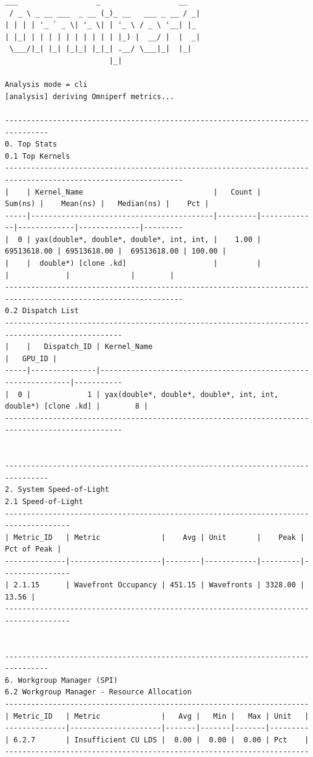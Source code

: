 \documentclass[
]{article}
\begin{document}
\begin{Verbatim}[fontsize=\footnotesize]
  ___                  _                  __
 / _ \ _ __ ___  _ __ (_)_ __   ___ _ __ / _|
| | | | '_ ` _ \| '_ \| | '_ \ / _ \ '__| |_
| |_| | | | | | | | | | | |_) |  __/ |  |  _|
 \___/|_| |_| |_|_| |_|_| .__/ \___|_|  |_|
                        |_|

Analysis mode = cli
[analysis] deriving Omniperf metrics...

--------------------------------------------------------------------------------
0. Top Stats
0.1 Top Kernels
---------------------------------------------------------------------------------------------------------------
|    | Kernel_Name                              |   Count |     Sum(ns) |    Mean(ns) |   Median(ns) |    Pct |
-----|------------------------------------------|---------|-------------|-------------|--------------|---------
|  0 | yax(double*, double*, double*, int, int, |    1.00 | 69513618.00 | 69513618.00 |  69513618.00 | 100.00 |
|    |  double*) [clone .kd]                    |         |             |             |              |        |
---------------------------------------------------------------------------------------------------------------
0.2 Dispatch List
-------------------------------------------------------------------------------------------------
|    |   Dispatch_ID | Kernel_Name                                                   |   GPU_ID |
-----|---------------|---------------------------------------------------------------|-----------
|  0 |             1 | yax(double*, double*, double*, int, int, double*) [clone .kd] |        8 |
-------------------------------------------------------------------------------------------------


--------------------------------------------------------------------------------
2. System Speed-of-Light
2.1 Speed-of-Light
-------------------------------------------------------------------------------------
| Metric_ID   | Metric              |    Avg | Unit       |    Peak |   Pct of Peak |
--------------|---------------------|--------|------------|---------|----------------
| 2.1.15      | Wavefront Occupancy | 451.15 | Wavefronts | 3328.00 |         13.56 |
-------------------------------------------------------------------------------------


--------------------------------------------------------------------------------
6. Workgroup Manager (SPI)
6.2 Workgroup Manager - Resource Allocation
----------------------------------------------------------------------
| Metric_ID   | Metric              |   Avg |   Min |   Max | Unit   |
--------------|---------------------|-------|-------|-------|---------
| 6.2.7       | Insufficient CU LDS |  0.00 |  0.00 |  0.00 | Pct    |
----------------------------------------------------------------------
\end{Verbatim}
\end{document}
